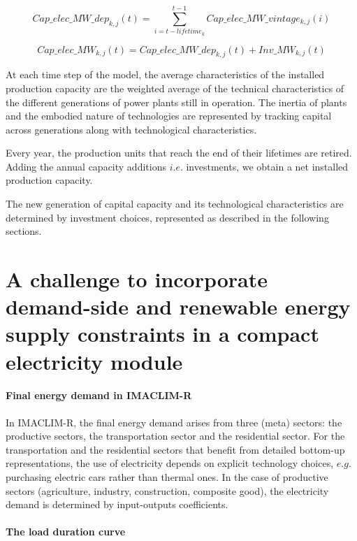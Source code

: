 \begin{dmath}
    Cap\_elec\_MW\_dep_{k,j}(t) = \sum_{i = t - lifetime_{k}}^{t-1}Cap\_elec\_MW\_vintage_{k,j}(i)
    \label{eqn:Cap_elec_dep}
\end{dmath}

\begin{dmath}
    Cap\_elec\_MW_{k,j}(t) = Cap\_elec\_MW\_dep_{k,j}(t) + Inv\_MW_{k,j}(t)
    \label{eqn:Cap_elec}
\end{dmath}





At each time step of the model, the average characteristics of the installed production capacity are the weighted average of the technical characteristics of the different generations of power plants still in operation.
The inertia of plants and the embodied nature of technologies are represented by tracking capital across generations along with technological characteristics.


Every year, the production units that reach the end of their lifetimes are retired.
Adding the annual capacity additions $i.e.$ investments, we obtain a net installed production capacity.

The new generation of capital capacity and its technological characteristics are determined by investment choices, represented as described in the following sections.


\section{A challenge to incorporate demand-side and renewable energy supply constraints in a compact electricity module}

\paragraph{Final energy demand in IMACLIM-R}
In IMACLIM-R, the final energy demand arises from three (meta) sectors: the productive sectors, the transportation sector and the residential sector. For the transportation and the residential sectors that benefit from detailed bottom-up representations, the use of electricity depends on explicit technology choices, $e.g.$ purchasing electric cars rather than thermal ones. In the case of productive sectors (agriculture, industry, construction, composite good), the electricity demand is determined by input-outputs coefficients.

\paragraph{The load duration curve}

